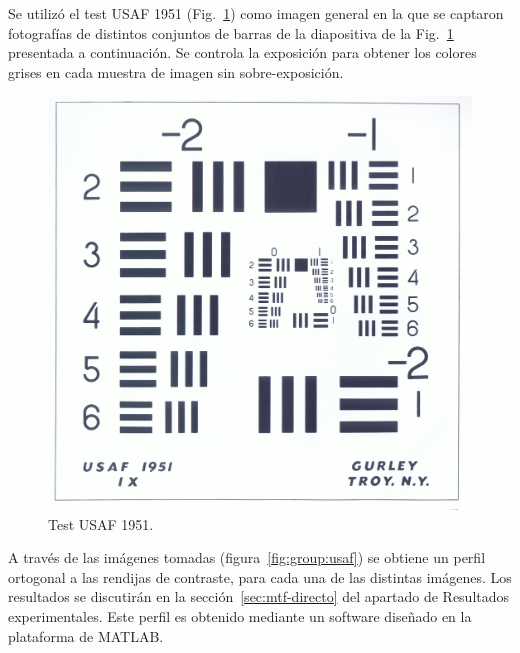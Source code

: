 \documentclass{./packages/optica-article}
\begin{document}
Se utilizó el test USAF 1951 (Fig.~\ref{fig:usaf1951}) como imagen general en la que se captaron fotografías de  distintos conjuntos de barras de la diapositiva de la Fig.~\ref{fig:usaf1951} presentada a continuación. Se controla la exposición para obtener los colores grises en cada muestra de imagen sin sobre-exposición.

\begin{figure}[h]
	\centering
	\includegraphics[scale=0.08]{testusaf1951}
	\caption{Test USAF 1951.}\label{fig:usaf1951}
\end{figure}

A través de las imágenes tomadas (figura~\ref{fig:group:usaf}) se obtiene un perfil ortogonal a las rendijas de contraste, para cada una de las distintas imágenes. Los resultados se discutirán en la sección~\ref{sec:mtf-directo} del apartado de Resultados experimentales. Este perfil es obtenido mediante un software diseñado en la plataforma de MATLAB.
\end{document}
